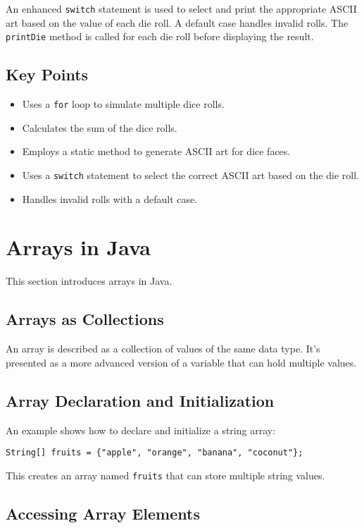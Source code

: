 \documentclass{article}
\begin{document}
An enhanced \texttt{switch} statement is used to select and print the appropriate ASCII art based on the value of each die roll. A default case handles invalid rolls.  The \texttt{printDie} method is called for each die roll before displaying the result.

\subsection{Key Points}

\begin{itemize}
    \item Uses a \texttt{for} loop to simulate multiple dice rolls.
    \item Calculates the sum of the dice rolls.
    \item Employs a static method to generate ASCII art for dice faces.
    \item Uses a \texttt{switch} statement to select the correct ASCII art based on the die roll.
    \item Handles invalid rolls with a default case.
\end{itemize}


\section{Arrays in Java}

This section introduces arrays in Java.

\subsection{Arrays as Collections}

An array is described as a collection of values of the same data type.  It's presented as a more advanced version of a variable that can hold multiple values.

\subsection{Array Declaration and Initialization}

An example shows how to declare and initialize a string array:

\texttt{String[] fruits = \{"apple", "orange", "banana", "coconut"\};}

This creates an array named \texttt{fruits} that can store multiple string values.

\subsection{Accessing Array Elements}
\end{document}
